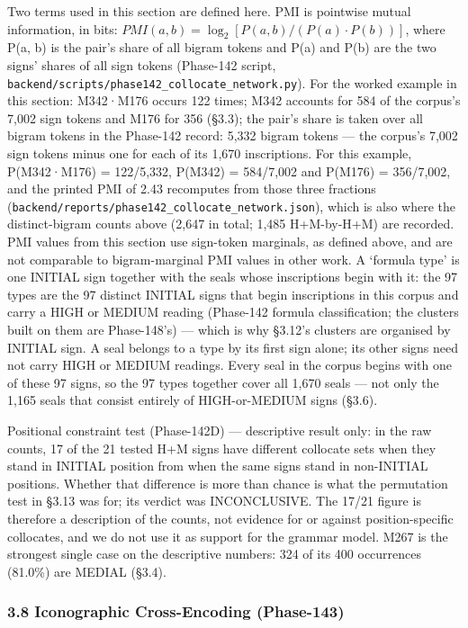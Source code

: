 \documentclass[
]{article}
\begin{document}
Two terms used in this section are defined here. PMI is pointwise mutual information, in bits: $PMI(a, b) = \log_2 [ P(a, b) / (P(a) \cdot P(b)) ]$, where P(a, b) is the pair's share of all bigram tokens and P(a) and P(b) are the two signs' shares of all sign tokens (Phase-142 script, \texttt{backend/scripts/phase142\_collocate\_network.py}). For the worked example in this section: M342·M176 occurs 122 times; M342 accounts for 584 of the corpus's 7,002 sign tokens and M176 for 356 (§3.3); the pair's share is taken over all bigram tokens in the Phase-142 record: 5,332 bigram tokens --- the corpus's 7,002 sign tokens minus one for each of its 1,670 inscriptions. For this example, P(M342·M176) = 122/5,332, P(M342) = 584/7,002 and P(M176) = 356/7,002, and the printed PMI of 2.43 recomputes from those three fractions (\texttt{backend/reports/phase142\_collocate\_network.json}), which is also where the distinct-bigram counts above (2,647 in total; 1,485 H+M-by-H+M) are recorded. PMI values from this section use sign-token marginals, as defined above, and are not comparable to bigram-marginal PMI values in other work. A `formula type' is one INITIAL sign together with the seals whose inscriptions begin with it: the 97 types are the 97 distinct INITIAL signs that begin inscriptions in this corpus and carry a HIGH or MEDIUM reading (Phase-142 formula classification; the clusters built on them are Phase-148's) --- which is why §3.12's clusters are organised by INITIAL sign. A seal belongs to a type by its first sign alone; its other signs need not carry HIGH or MEDIUM readings. Every seal in the corpus begins with one of these 97 signs, so the 97 types together cover all 1,670 seals --- not only the 1,165 seals that consist entirely of HIGH-or-MEDIUM signs (§3.6).

Positional constraint test (Phase-142D) --- descriptive result only: in the raw counts, 17 of the 21 tested H+M signs have different collocate sets when they stand in INITIAL position from when the same signs stand in non-INITIAL positions. Whether that difference is more than chance is what the permutation test in §3.13 was for; its verdict was INCONCLUSIVE. The 17/21 figure is therefore a description of the counts, not evidence for or against position-specific collocates, and we do not use it as support for the grammar model. M267 is the strongest single case on the descriptive numbers: 324 of its 400 occurrences (81.0\%) are MEDIAL (§3.4).

\subsubsection{3.8 Iconographic Cross-Encoding
(Phase-143)}\label{iconographic-cross-encoding-phase-143}
\end{document}
